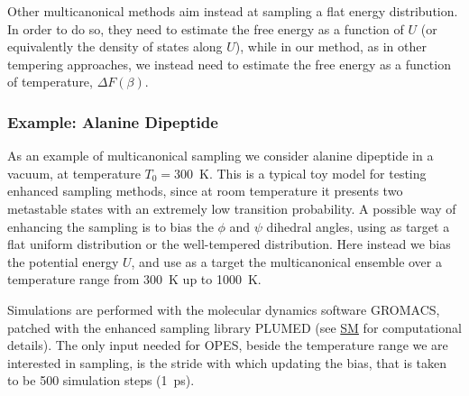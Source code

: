 \documentclass[aps,prx,reprint,superscriptaddress]{revtex4-1} %
\begin{document}
Other multicanonical methods aim instead at sampling a flat energy distribution\cite{Berg1991,Lee1993,Piaggi2019}.
In order to do so, they need to estimate the free energy as a function of $U$ (or equivalently the density of states along $U$), while in our method, as in other tempering approaches\cite{Martinsson2019}, we instead need to estimate the free energy as a function of temperature, $\Delta F(\beta)$.

\subsubsection*{Example: Alanine Dipeptide}
As an example of multicanonical sampling we consider alanine dipeptide in a vacuum, at temperature $T_0=300$~K.
This is a typical toy model for testing enhanced sampling methods, since at room temperature it presents two metastable states with an extremely low transition probability.
A possible way of enhancing the sampling is to bias the $\phi$ and $\psi$ dihedral angles, using as target a flat uniform distribution or the well-tempered distribution\cite{Invernizzi2020}.
Here instead we bias the potential energy $U$, and use as a target the multicanonical ensemble over a temperature range from 300~K up to 1000~K.

Simulations are performed with the molecular dynamics software GROMACS\cite{gromacs}, patched with the enhanced sampling library PLUMED\cite{plumed} (see \href{https://arxiv.org/src/2007.03055v3/anc/SupplementalMaterial.pdf}{SM} for computational details).
The only input needed for OPES, beside the temperature range we are interested in sampling, is the stride with which updating the bias, that is taken to be 500 simulation steps (1~ps).
\end{document}
